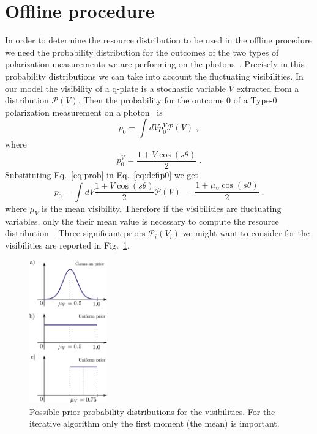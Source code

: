 \documentclass[aps, pra, 10pt, twocolumn, superscriptaddress,floatfix]{revtex4-1}
\begin{document}
\section{Offline procedure}
%
In order to determine the resource distribution to be used in the offline procedure we need the probability distribution for the outcomes of the two types of polarization measurements we are performing on the photons~\cite{Cimini2021, Belliardo2020}. Precisely in this probability distributions we can take into account the fluctuating visibilities. In our model the visibility of a q-plate is a stochastic variable $V$ extracted from a distribution $\mathcal{P} (V)$. Then the probability for the outcome $0$ of a Type-$0$ polarization measurement on a photon~\cite{Belliardo2020} is
%
\begin{equation}
	p_0 = \int dV p_0^V \mathcal{P} (V) \; ,
	\label{eq:defip0}
\end{equation}
%
where 
%
\begin{equation}
	p_0^V = \frac{1+V \cos(s \theta)}{2} \; .
	\label{eq:prob}
\end{equation}
%
Substituting Eq.~\eqref{eq:prob} in Eq.~\eqref{eq:defip0} we get
%
\begin{equation}
	p_0 = \int dV \frac{1+V \cos(s \theta)}{2} \mathcal{P} (V) \;  = \frac{1 + \mu_V \cos(s \theta)}{2} \; .
	\label{eq:der}
\end{equation}
%
where $\mu_V$ is the mean visibility. Therefore if the visibilities are fluctuating variables, only the their mean value is necessary to compute the resource distribution~\cite{Cimini2021}. 
Three significant priors $\mathcal{P}_i(V_i)$ we might want to consider for the visibilities are reported in Fig.~\ref{fig:prior}.
%
\begin{figure}[!t]
	\begin{center}
		\includegraphics[width=0.3\textwidth]{priorProbability.pdf}
	\end{center}
	\caption{Possible prior probability distributions for the visibilities. For the iterative algorithm only the first moment (the mean) is important.}
	\label{fig:prior}
\end{figure}
\end{document}
